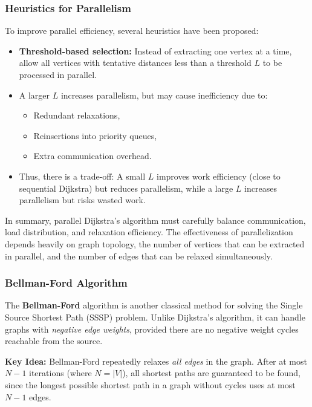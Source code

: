 \documentclass[12pt]{book}
\begin{document}
\subsubsection*{Heuristics for Parallelism}
To improve parallel efficiency, several heuristics have been proposed:
\begin{itemize}
    \item \textbf{Threshold-based selection:} Instead of extracting one vertex at a time, allow all vertices with tentative distances less than a threshold $L$ to be processed in parallel.
    \item A larger $L$ increases parallelism, but may cause inefficiency due to:
    \begin{itemize}
        \item Redundant relaxations,
        \item Reinsertions into priority queues,
        \item Extra communication overhead.
    \end{itemize}
    \item Thus, there is a trade-off:  
    A small $L$ improves work efficiency (close to sequential Dijkstra) but reduces parallelism,  
    while a large $L$ increases parallelism but risks wasted work.
\end{itemize}

\medskip
\noindent
In summary, parallel Dijkstra’s algorithm must carefully balance communication, load distribution, and relaxation efficiency. The effectiveness of parallelization depends heavily on graph topology, the number of vertices that can be extracted in parallel, and the number of edges that can be relaxed simultaneously.

\subsubsection{Bellman-Ford Algorithm}

The \textbf{Bellman-Ford} algorithm is another classical method for solving the Single Source Shortest Path (SSSP) problem.  
Unlike Dijkstra’s algorithm, it can handle graphs with \emph{negative edge weights}, provided there are no negative weight cycles reachable from the source.

\medskip
\noindent
\textbf{Key Idea:}  
Bellman-Ford repeatedly relaxes \emph{all edges} in the graph. After at most $N-1$ iterations (where $N = |V|$), all shortest paths are guaranteed to be found, since the longest possible shortest path in a graph without cycles uses at most $N-1$ edges.
\end{document}
